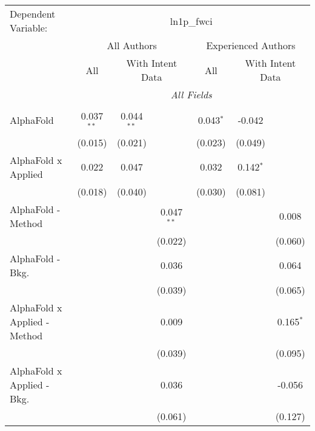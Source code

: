 \begingroup
\centering
\begin{tabular}{lcccccc}
   \tabularnewline \midrule \midrule
   Dependent Variable: & \multicolumn{6}{c}{ln1p\_fwci}\\
 & \multicolumn{3}{c}{All Authors} & \multicolumn{3}{c}{Experienced Authors} \\
\cmidrule(lr){2-4} \cmidrule(lr){5-7}
 & \multicolumn{1}{c}{All} & \multicolumn{2}{c}{With Intent Data} & \multicolumn{1}{c}{All} & \multicolumn{2}{c}{With Intent Data} \\
\cmidrule(lr){2-2} \cmidrule(lr){3-4} \cmidrule(lr){5-5} \cmidrule(lr){6-7}
 & \multicolumn{6}{c}{\textit{All Fields}} \\ \\
   AlphaFold                      & 0.037$^{**}$ & 0.044$^{**}$ &              & 0.043$^{*}$  & -0.042      &   \\   
                                  & (0.015)      & (0.021)      &              & (0.023)      & (0.049)     &   \\   
   AlphaFold x Applied            & 0.022        & 0.047        &              & 0.032        & 0.142$^{*}$ &   \\   
                                  & (0.018)      & (0.040)      &              & (0.030)      & (0.081)     &   \\   
   AlphaFold - Method             &              &              & 0.047$^{**}$ &              &             & 0.008\\   
                                  &              &              & (0.022)      &              &             & (0.060)\\   
   AlphaFold - Bkg.               &              &              & 0.036        &              &             & 0.064\\   
                                  &              &              & (0.039)      &              &             & (0.065)\\   
   AlphaFold x Applied - Method   &              &              & 0.009        &              &             & 0.165$^{*}$\\   
                                  &              &              & (0.039)      &              &             & (0.095)\\   
   AlphaFold x Applied - Bkg.     &              &              & 0.036        &              &             & -0.056\\   
                                  &              &              & (0.061)      &              &             & (0.127)\\   

\end{tabular}
